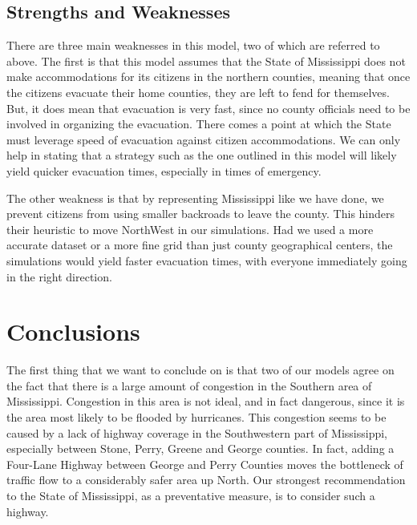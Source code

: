 \documentclass[titlepage]{article}
\begin{document}
  \subsection{Strengths and Weaknesses}
    \par There are three main weaknesses in this model, two of which are referred to above. The first is that this model assumes that the State of Mississippi does not make accommodations for its citizens in the northern counties, meaning that once the citizens evacuate their home counties, they are left to fend for themselves. But, it does mean that evacuation is very fast, since no county officials need to be involved in organizing the evacuation. There comes a point at which the State must leverage speed of evacuation against citizen accommodations. We can only help in stating that a strategy such as the one outlined in this model will likely yield quicker evacuation times, especially in times of emergency.
    \par The other weakness is that by representing Mississippi like we have done, we prevent citizens from using smaller backroads to leave the county. This hinders their heuristic to move NorthWest in our simulations. Had we used a more accurate dataset or a more fine grid than just county geographical centers, the simulations would yield faster evacuation times, with everyone immediately going in the right direction.

\section{Conclusions}
\label{sec:conclusions}
\par The first thing that we want to conclude on is that two of our models agree on the fact that there is a large amount of congestion in the Southern area of Mississippi. Congestion in this area is not ideal, and in fact dangerous, since it is the area most likely to be flooded by hurricanes. This congestion seems to be caused by a lack of highway coverage in the Southwestern part of Mississippi, especially between Stone, Perry, Greene and George counties. In fact, adding a Four-Lane Highway between George and Perry Counties moves the bottleneck of traffic flow to a considerably safer area up North. Our strongest recommendation to the State of Mississippi, as  a preventative measure, is to consider such a highway.\\
\end{document}
